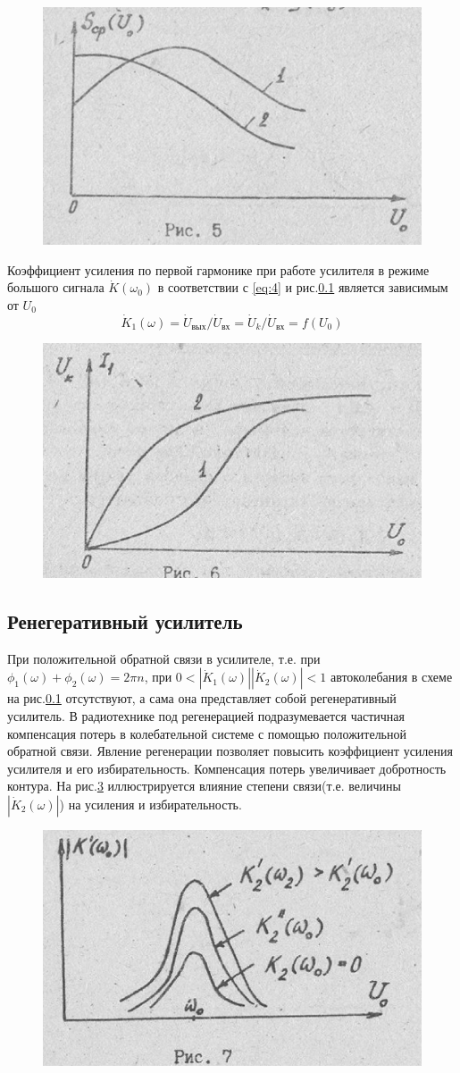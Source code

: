 \begin{figure}[h]
	\centering
	\includegraphics[width=0.4\linewidth]{circuit/5.jpg}
	\caption{}
	\label{fig:figure5}
\end{figure}

Коэффициент усиления по первой гармонике при работе усилителя в режиме большого сигнала $\dot{K}(\omega_0)$ в соответствии с \eqref{eq:4} и рис.\ref{} является зависимым от $U_0$
\begin{equation}
\dot{K}_1(\omega)=\dot{U}_\text{вых}/\dot{U}_\text{вх}=\dot{U}_k/\dot{U}_\text{вх}=f(U_0)
\label{eq:6}
\end{equation}

\begin{figure}[h]
	\centering
	\includegraphics[width=0.4\linewidth]{circuit/6.jpg}
	\caption{}
	\label{fig:figure6}
\end{figure}

\subsection{Ренегеративный усилитель}
При положительной обратной связи в усилителе, т.е. при $\phi_1(\omega)+\phi_2(\omega)=2\pi n$, при $0<|\dot{K}_1(\omega)||\dot{K}_2(\omega)|<1$ автоколебания в схеме на рис.\ref{} отсутствуют, а сама она представляет собой регенеративный усилитель. В радиотехнике под регенерацией подразумевается частичная компенсация потерь в колебательной системе с помощью положительной обратной связи. Явление регенерации позволяет повысить коэффициент усиления усилителя и его избирательность. Компенсация потерь увеличивает добротность контура. На рис.\ref{fig:figure7} иллюстрируется влияние степени связи(т.е. величины $|\dot{K}_2(\omega)|$) на усиления и избирательность.

\begin{figure}[h]
	\centering
	\includegraphics[width=0.4\linewidth]{circuit/7.jpg}
	\caption{}
	\label{fig:figure7}
\end{figure}

